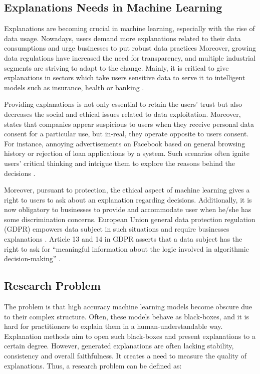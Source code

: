 \documentclass[english]{tktltiki2}
\theoremstyle{definition}
\theoremstyle{remark}
\begin{document}
\subsection{Explanations Needs in Machine Learning} %
Explanations are becoming crucial in machine learning, especially with the rise of data usage. Nowadays, users demand more explanations related to their data consumptions and urge businesses to put robust data practices \citep{doshi2017accountability} Moreover, growing data regulations have increased the need for transparency, and multiple industrial segments are striving to adapt to the change. Mainly, it is critical to give explanations in sectors which take users sensitive data to serve it to intelligent models such as insurance, health or banking \citep{molnarinterpretable}. 

Providing explanations is not only essential to retain the users’ trust but also decreases the social and ethical issues related to data exploitation. Moreover, \citet{lipton2016mythos} states that companies appear suspicious to users when they receive personal data consent for a particular use, but in-real, they operate opposite to users consent. For instance, annoying advertisements on Facebook based on general browsing history or rejection of loan applications by a system. Such scenarios often ignite users’ critical thinking and intrigue them to explore the reasons behind the decisions \citep{honegger2018shedding, guidotti2018survey}.

Moreover, pursuant to protection, the ethical aspect of machine learning gives a right to users to ask about an explanation regarding decisions. Additionally, it is now obligatory to businesses to provide and accommodate user when he/she has some discrimination concerns. European Union general data protection regulation (GDPR) empowers data subject in such situations and require businesses  explanations \citep{doshi2017accountability, goodman2017european}. Article 13 and 14 in GDPR asserts that a data subject has the right to ask for “meaningful information about the logic involved in algorithmic decision-making” \citep{goodman2017european}.

\subsection{Research Problem} %
The problem is that high accuracy machine learning models become obscure due to their complex structure. Often, these models behave as black-boxes, and it is hard for practitioners to explain them in a human-understandable way. Explanation methods aim to open such black-boxes and present explanations to a certain degree. However, generated explanations are often lacking stability, consistency and overall faithfulness. It creates a need to measure the quality of explanations. Thus, a research problem can be defined as:
\end{document}
